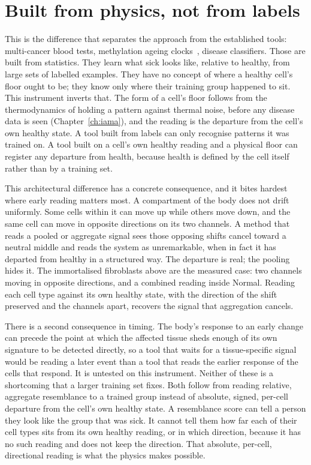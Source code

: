 \section{Built from physics, not from labels}\label{sec:ag_physics}

This is the difference that separates the approach from the established tools: multi-cancer blood tests, methylation ageing
clocks~\cite{Horvath2013}, disease classifiers. Those are built from statistics. They learn what sick looks like, relative to healthy,
from large sets of labelled examples. They have no concept of where a healthy cell's floor ought to be; they know only where their
training group happened to sit. This instrument inverts that. The form of a cell's floor follows from the thermodynamics of holding
a pattern against thermal noise, before any disease data is seen (Chapter~\ref{ch:iama}), and the reading is the departure from the
cell's own healthy state. A tool built from labels can only recognise patterns it was trained on. A tool built on a cell's own healthy
reading and a physical floor can register any departure from health, because health is defined by the cell itself rather than by a
training set. \interp

This architectural difference has a concrete consequence, and it bites hardest where early reading matters most. A compartment of the
body does not drift uniformly. Some cells within it can move up while others move down, and the same cell can move in opposite directions
on its two channels. A method that reads a pooled or aggregate signal sees those opposing shifts cancel toward a neutral middle and reads
the system as unremarkable, when in fact it has departed from healthy in a structured way. The departure is real; the pooling hides it.
The immortalised fibroblasts above are the measured case: two channels moving in opposite directions, and a combined reading inside
Normal. \measured{} Reading each cell type against its own healthy state, with the direction of the shift preserved and the channels
apart, recovers the signal that aggregation cancels. \derived

There is a second consequence in timing. The body's response to an early change can precede the point at which the affected tissue
sheds enough of its own signature to be detected directly, so a tool that waits for a tissue-specific signal would be reading a later
event than a tool that reads the earlier response of the cells that respond. \conjecture{} It is untested on this instrument.
\openprob{} Neither of these is a shortcoming that a larger training set fixes. Both follow from reading relative, aggregate resemblance
to a trained group instead of absolute, signed, per-cell departure from the cell's own healthy state. A resemblance score can tell a
person they look like the group that was sick. It cannot tell them how far each of their cell types sits from its own healthy reading, or
in which direction, because it has no such reading and does not keep the direction. That absolute, per-cell, directional reading is what
the physics makes possible. \interp

